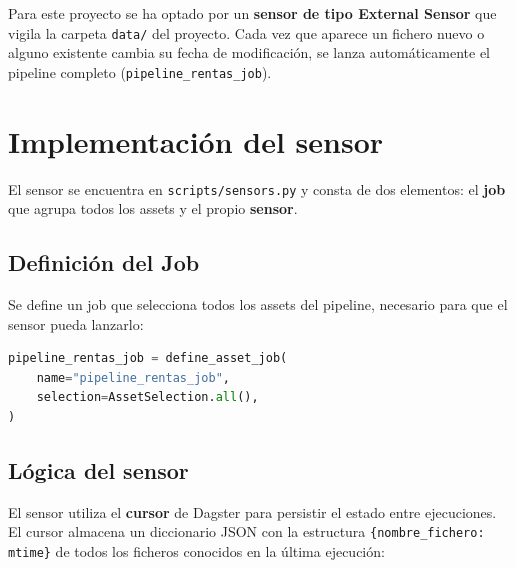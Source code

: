 \documentclass[11pt]{report}
\begin{document}
Para este proyecto se ha optado por un \textbf{sensor de tipo External Sensor} que vigila la
carpeta \texttt{data/} del proyecto. Cada vez que aparece un fichero nuevo o alguno existente
cambia su fecha de modificación, se lanza automáticamente el pipeline completo
(\texttt{pipeline\_rentas\_job}).

\section{Implementación del sensor}

El sensor se encuentra en \texttt{scripts/sensors.py} y consta de dos elementos: el
\textbf{job} que agrupa todos los assets y el propio \textbf{sensor}.

\newpage

\subsection{Definición del Job}

Se define un job que selecciona todos los assets del pipeline, necesario para que el sensor
pueda lanzarlo:

\begin{lstlisting}[style=mystyle, language=Python, caption={Job del pipeline completo}]
pipeline_rentas_job = define_asset_job(
    name="pipeline_rentas_job",
    selection=AssetSelection.all(),
)
\end{lstlisting}

\subsection{Lógica del sensor}

El sensor utiliza el \textbf{cursor} de Dagster para persistir el estado entre ejecuciones.
El cursor almacena un diccionario JSON con la estructura \texttt{\{nombre\_fichero: mtime\}}
de todos los ficheros conocidos en la última ejecución:
\end{document}
